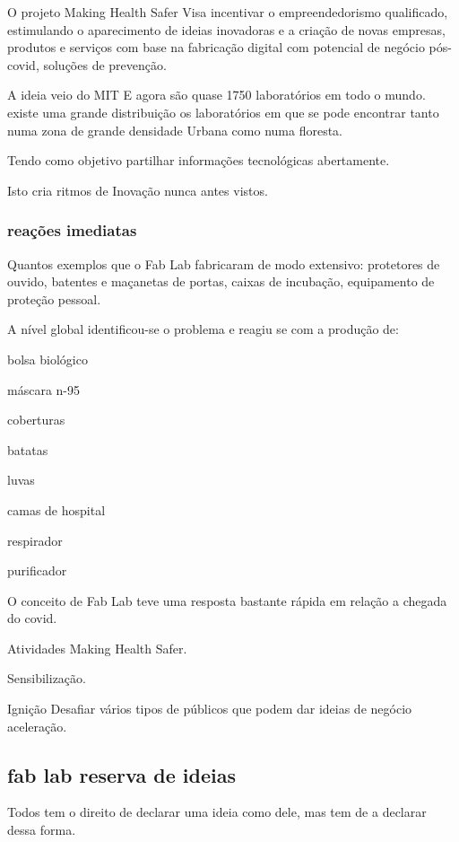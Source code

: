 O projeto Making Health Safer Visa incentivar o empreendedorismo
qualificado, estimulando o aparecimento de ideias inovadoras e a criação
de novas empresas, produtos e serviços com base na fabricação digital
com potencial de negócio pós-covid, soluções de prevenção.

A ideia veio do MIT E agora são quase 1750 laboratórios em todo o mundo.
existe uma grande distribuição os laboratórios em que se pode encontrar
tanto numa zona de grande densidade Urbana como numa floresta.

Tendo como objetivo partilhar informações tecnológicas abertamente.

Isto cria ritmos de Inovação nunca antes vistos.

\newpage
\subsubsection{reações imediatas}

Quantos exemplos que o Fab Lab fabricaram de modo extensivo: protetores
de ouvido, batentes e maçanetas de portas, caixas de incubação,
equipamento de proteção pessoal.

A nível global identificou-se o problema e reagiu se com a produção de:

\begin{compactitem}
      \item bolsa biológico
      \item máscara n-95
      \item coberturas
      \item batatas
      \item luvas
      \item camas de hospital
      \item respirador
      \item purificador
\end{compactitem}

O conceito de Fab Lab teve uma resposta bastante rápida em relação a
chegada do covid.

Atividades Making Health Safer.

Sensibilização.

Ignição Desafiar vários tipos de públicos que podem dar ideias de
negócio aceleração.



\subsection{fab lab reserva de ideias}

Todos tem o direito de declarar uma ideia como dele, mas tem de a
declarar dessa forma.
